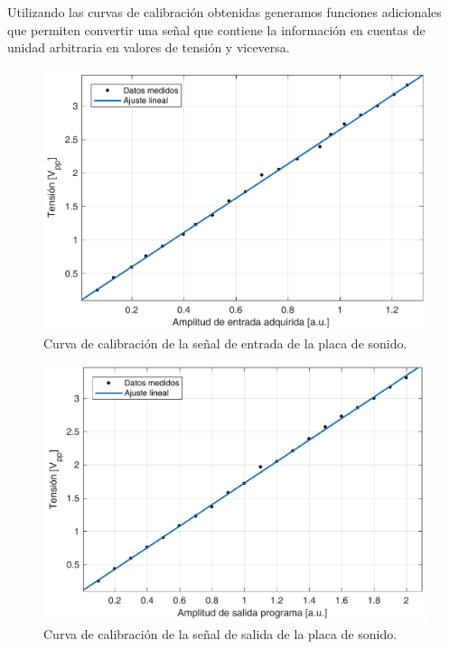 \documentclass[a4paper,11pt]{article}
\begin{document}
Utilizando las curvas de calibración obtenidas generamos funciones
adicionales que permiten convertir una señal que contiene la información
en cuentas de unidad arbitraria en valores de tensión y viceversa.

	\begin{figure}[!h]
		\centering
		\includegraphics[width=\textwidth]{imagenes/CalibracionEntrada.pdf}
		\caption{Curva de calibración de la señal de entrada de la placa
de sonido.}
        \label{fig:CalibracionEntrada}
	\end{figure}
	
	\begin{figure}[!h]
		\centering
		\includegraphics[width=\textwidth]{imagenes/CalibracionSalida.pdf}
		\caption{Curva de calibración de la señal de salida de la placa
de sonido.}
        \label{fig:CalibracionSalida}
	\end{figure}
\end{document}
